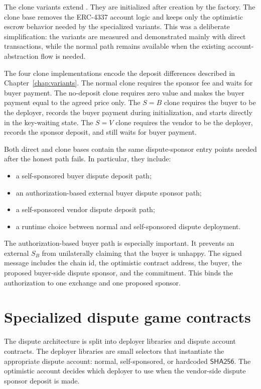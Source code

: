 The clone variants extend . They are initialized
after creation by the factory. The clone base removes the ERC-4337 account logic and keeps
only the optimistic escrow behavior needed by the specialized variants. This was a
deliberate simplification: the variants are measured and demonstrated mainly with direct
transactions, while the normal path remains available when the existing account-abstraction
flow is needed.

The four clone implementations encode the deposit differences described in
Chapter~\ref{chap:variants}. The normal clone requires the sponsor fee and waits for buyer
payment. The no-deposit clone requires zero value and makes the buyer payment equal to the
agreed price only. The \(S=B\) clone requires the buyer to be the deployer, records the buyer
payment during initialization, and starts directly in the key-waiting state. The \(S=V\)
clone requires the vendor to be the deployer, records the sponsor deposit, and still waits
for buyer payment.

Both direct and clone bases contain the same dispute-sponsor entry points needed after the
honest path fails. In particular, they include:

\begin{itemize}
  \item a self-sponsored buyer dispute deposit path;
  \item an authorization-based external buyer dispute sponsor path;
  \item a self-sponsored vendor dispute deposit path;
  \item a runtime choice between normal and self-sponsored dispute deployment.
\end{itemize}

The authorization-based buyer path is especially important. It prevents an external
\(S_B\) from unilaterally claiming that the buyer is unhappy. The signed message includes
the chain id, the optimistic contract address, the buyer, the proposed buyer-side dispute
sponsor, and the commitment. This binds the authorization to one exchange and one proposed
sponsor.

\section{Specialized dispute game contracts}

The dispute architecture is split into deployer libraries and dispute account contracts.
The deployer libraries are small selectors that instantiate the appropriate dispute account:
normal, self-sponsored, or hardcoded \(\mathsf{SHA256}\). The optimistic account decides
which deployer to use when the vendor-side dispute sponsor deposit is made.

